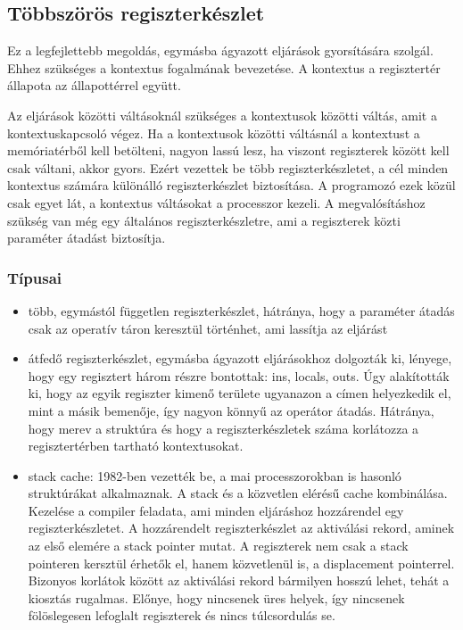 \subsection{Többszörös regiszterkészlet}
Ez a legfejlettebb megoldás, egymásba ágyazott eljárások gyorsítására szolgál.
Ehhez szükséges a kontextus fogalmának bevezetése.
A kontextus a regisztertér állapota az állapottérrel együtt.

Az eljárások közötti váltásoknál szükséges a kontextusok közötti váltás, amit a kontextuskapcsoló végez.
Ha a kontextusok közötti váltásnál a kontextust a memóriatérből kell betölteni, nagyon lassú lesz, ha viszont regiszterek között kell csak váltani, akkor gyors.
Ezért vezettek be több regiszterkészletet, a cél minden kontextus számára különálló regiszterkészlet biztosítása.
A programozó ezek közül csak egyet lát, a kontextus váltásokat a processzor kezeli.
A megvalósításhoz szükség van még egy általános regiszterkészletre, ami a regiszterek közti paraméter átadást biztosítja.

\subsubsection{Típusai}
\begin{itemize}
    \item több, egymástól független regiszterkészlet, hátránya, hogy a paraméter átadás csak az operatív táron keresztül történhet, ami lassítja az eljárást
    \item átfedő regiszterkészlet, egymásba ágyazott eljárásokhoz dolgozták ki, lényege, hogy egy regisztert három részre bontottak: ins, locals, outs. Úgy alakították ki, hogy az egyik regiszter kimenő területe ugyanazon a címen helyezkedik el, mint a másik bemenője, így nagyon könnyű az operátor átadás. Hátránya, hogy merev a struktúra és hogy a regiszterkészletek száma korlátozza a regisztertérben tartható kontextusokat.
    \item stack cache: 1982-ben vezették be, a mai processzorokban is hasonló struktúrákat alkalmaznak. A stack és a közvetlen elérésű cache kombinálása. Kezelése a compiler feladata, ami minden eljáráshoz hozzárendel egy regiszterkészletet. A hozzárendelt regiszterkészlet az aktiválási rekord, aminek az első elemére a stack pointer mutat. A regiszterek nem csak a stack pointeren kersztül érhetők el, hanem közvetlenül is, a displacement pointerrel. Bizonyos korlátok között az aktiválási rekord bármilyen hosszú lehet, tehát a kiosztás rugalmas. Előnye, hogy nincsenek üres helyek, így nincsenek fölöslegesen lefoglalt regiszterek és nincs túlcsordulás se.
\end{itemize}